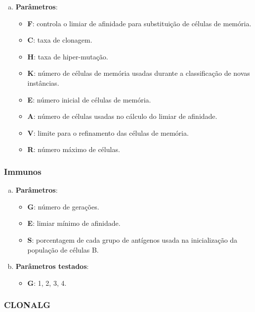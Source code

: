 \begin{enumerate}[a)]
    \item \textbf{Parâmetros}:
        \begin{itemize}
        \item \textbf{F}: controla o limiar de afinidade para substituição de células de memória.
        \item \textbf{C}: taxa de clonagem.
        \item \textbf{H}: taxa de hiper-mutação.
        \item \textbf{K}: número de células de memória usadas durante a classificação de novas instâncias.
        \item \textbf{E}: número inicial de células de memória.
        \item \textbf{A}: número de células usadas no cálculo do limiar de afinidade.
        \item \textbf{V}: limite para o refinamento das células de memória.
        \item \textbf{R}: número máximo de células.
        \end{itemize}
\end{enumerate}

\subsubsection{Immunos}

\begin{enumerate}[a)]
    \item \textbf{Parâmetros}:
        \begin{itemize}
            \item \textbf{G}: número de gerações.
            \item \textbf{E}: limiar mínimo de afinidade.
            \item \textbf{S}: porcentagem de cada grupo de antígenos usada na inicialização da população de células B.
        \end{itemize}
    \item \textbf{Parâmetros testados}:
        \begin{itemize}
            \item \textbf{G}: 1, 2, 3, 4.
        \end{itemize}
\end{enumerate}

\subsubsection{CLONALG}

